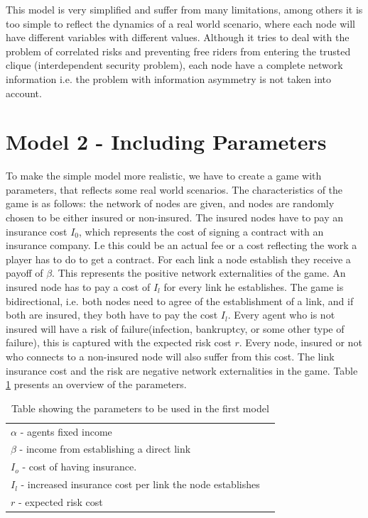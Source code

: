 This model is very simplified and suffer from many limitations, among others it is too simple to reflect the dynamics of a real world scenario, where each node will have different variables with different values. Although it tries to deal with the problem of correlated risks and preventing free riders from entering the trusted clique (interdependent security problem), each node have a complete network information i.e. the problem with information asymmetry is not taken into account. 

\section{Model 2 - Including Parameters}
To make the simple model more realistic, we have to create a game with parameters, that reflects some real world scenarios. The characteristics of the game is as follows: the network of nodes are given, and nodes are randomly chosen to be either insured or non-insured. The insured nodes have to pay an insurance cost $I_{0}$, which represents the cost of signing a contract with an insurance company. I.e this could be an actual fee or a cost reflecting the work a player has to do to get a contract. For each link a node establish they receive a payoff of $\beta$. This represents the positive network externalities of the game. An insured node has to pay a cost of $I_{l}$ for every link he establishes. The game is bidirectional, i.e. both nodes need to agree of the establishment of a link, and if both are insured, they both have to pay the cost $I_{l}$. 
Every agent who is not insured will have a risk of failure(infection, bankruptcy, or some other type of failure), this is captured with the expected risk cost $r$. Every node, insured or not who connects to a non-insured node will also suffer from this cost. The link insurance cost and the risk are negative network externalities in the game. Table \ref{tbl:simplegamepara} presents an overview of the parameters. 
\begin{table}[h]
\centering
\begin{tabular}{lc}
 \hline
  $\alpha$ - agents fixed income\\
  $\beta$ - income from establishing a direct link \\
  $I_{o}$ - cost of having insurance. \\
  $I_{l}$ - increased insurance cost per link the node establishes\\
  $r$ - expected risk cost\\
  \hline
\end{tabular}
\caption{Table showing the parameters to be used in the first model \label{tbl:simplegamepara}}
\end{table}
